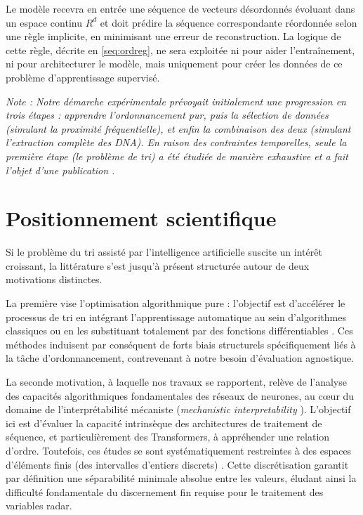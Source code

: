 Le modèle recevra en entrée une séquence de vecteurs désordonnés évoluant dans un espace continu $R^d$ et doit prédire la séquence correspondante réordonnée selon une règle implicite, en minimisant une erreur de reconstruction. La logique de cette règle, décrite en \ref{seq:ordreg}, ne sera exploitée ni pour aider l'entraînement, ni pour architecturer le modèle, mais uniquement pour créer les données de ce problème d'apprentissage supervisé.

\textit{Note : Notre démarche expérimentale prévoyait initialement une progression en trois étapes : apprendre l'ordonnancement pur, puis la sélection de données (simulant la proximité fréquentielle), et enfin la combinaison des deux (simulant l'extraction complète des DNA). En raison des contraintes temporelles, seule la première étape (le problème de tri) a été étudiée de manière exhaustive et a fait l'objet d'une publication \cite{cornu_learning_2025}.}

\section{Positionnement scientifique}
Si le problème du tri assisté par l'intelligence artificielle suscite un intérêt croissant, la littérature s'est jusqu'à présent structurée autour de deux motivations distinctes.

La première vise l'optimisation algorithmique pure : l'objectif est d'accélérer le processus de tri en intégrant l'apprentissage automatique au sein d'algorithmes classiques \cite{kraska_case_2018, zhu_deep_2024, ferragina_balanced_2024} ou en les substituant totalement par des fonctions différentiables \cite{kim_generalized_2024}. Ces méthodes induisent par conséquent de forts biais structurels spécifiquement liés à la tâche d'ordonnancement, contrevenant à notre besoin d'évaluation agnostique.

La seconde motivation, à laquelle nos travaux se rapportent, relève de l'analyse des capacités algorithmiques fondamentales des réseaux de neurones, au cœur du domaine de l'interprétabilité mécaniste (\textit{mechanistic interpretability} \cite{olah_zoom_2020}). L'objectif ici est d'évaluer la capacité intrinsèque des architectures de traitement de séquence, et particulièrement des Transformers, à appréhender une relation d'ordre. Toutefois, ces études se sont systématiquement restreintes à des espaces d'éléments finis (des intervalles d'entiers discrets) \cite{urdshals_structure_2025, matthew_one_nodate}. Cette discrétisation garantit par définition une séparabilité minimale absolue entre les valeurs, éludant ainsi la difficulté fondamentale du discernement fin requise pour le traitement des variables radar.

